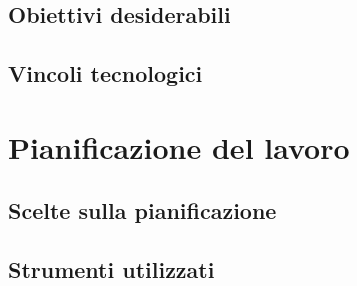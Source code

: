    \subsection{Obiettivi desiderabili}

   \subsection{Vincoli tecnologici}

\section{Pianificazione del lavoro}

   \subsection{Scelte sulla pianificazione}

   \subsection{Strumenti utilizzati}